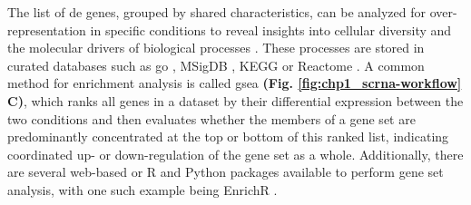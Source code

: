 \par The list of \gls{de} genes, grouped by shared characteristics, can be analyzed for over-representation in specific conditions to reveal insights into cellular diversity and the molecular drivers of biological processes \textbf{\cite{lueckenmalte_d_current_2019}}. These processes are stored in curated databases such as \gls{go} \textbf{\cite{ashburner_gene_2000}}, MSigDB \textbf{\cite{subramanian_gene_2005,liberzon_molecular_2011,castanza_extending_2023}}, KEGG \textbf{\cite{kanehisa_kegg_2017}} or Reactome \textbf{\cite{gillespie_reactome_2022}}. A common method for enrichment analysis is called \gls{gsea} \textbf{(Fig. \ref{fig:chp1_scrna-workflow} C)}\textbf{\cite{heumos_best_2023,subramanian_gene_2005,korotkevich_fast_2021}}, which ranks all genes in a dataset by their differential expression between the two conditions and then evaluates whether the members of a gene set are predominantly concentrated at the top or bottom of this ranked list, indicating coordinated up- or down-regulation of the gene set as a whole. Additionally, there are several web-based or R and Python packages available to perform gene set analysis, with one such example being EnrichR \textbf{\cite{chen_enrichr_2013,kuleshov_enrichr_2016}}. 




